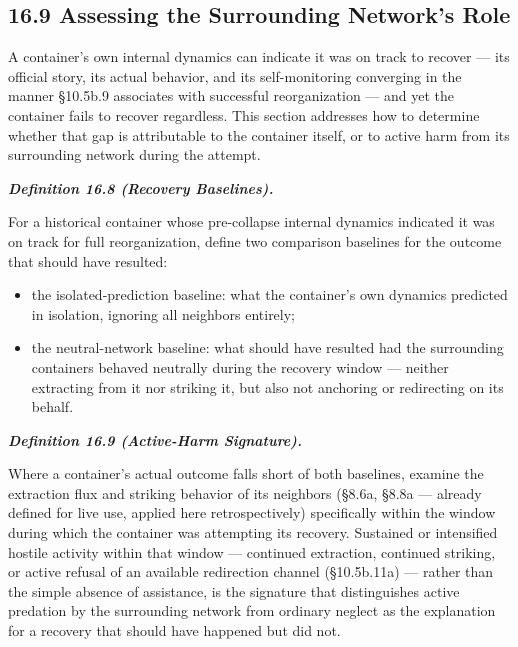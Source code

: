 \documentclass[
]{article}
\begin{document}
\hypertarget{assessing-the-surrounding-networks-role}{%
\subsection{16.9 Assessing the Surrounding Network's
Role}\label{assessing-the-surrounding-networks-role}}

A container's own internal dynamics can indicate it was on track to
recover --- its official story, its actual behavior, and its
self-monitoring converging in the manner §10.5b.9 associates with
successful reorganization --- and yet the container fails to recover
regardless. This section addresses how to determine whether that gap is
attributable to the container itself, or to active harm from its
surrounding network during the attempt.

\emph{\textbf{Definition 16.8 (Recovery Baselines).}}

For a historical container whose pre-collapse internal dynamics
indicated it was on track for full reorganization, define two comparison
baselines for the outcome that should have resulted:

\begin{itemize}
\item
  the isolated-prediction baseline: what the container's own dynamics
  predicted in isolation, ignoring all neighbors entirely;
\item
  the neutral-network baseline: what should have resulted had the
  surrounding containers behaved neutrally during the recovery window
  --- neither extracting from it nor striking it, but also not anchoring
  or redirecting on its behalf.
\end{itemize}

\emph{\textbf{Definition 16.9 (Active-Harm Signature).}}

Where a container's actual outcome falls short of both baselines,
examine the extraction flux and striking behavior of its neighbors
(§8.6a, §8.8a --- already defined for live use, applied here
retrospectively) specifically within the window during which the
container was attempting its recovery. Sustained or intensified hostile
activity within that window --- continued extraction, continued
striking, or active refusal of an available redirection channel
(§10.5b.11a) --- rather than the simple absence of assistance, is the
signature that distinguishes active predation by the surrounding network
from ordinary neglect as the explanation for a recovery that should have
happened but did not.
\end{document}
